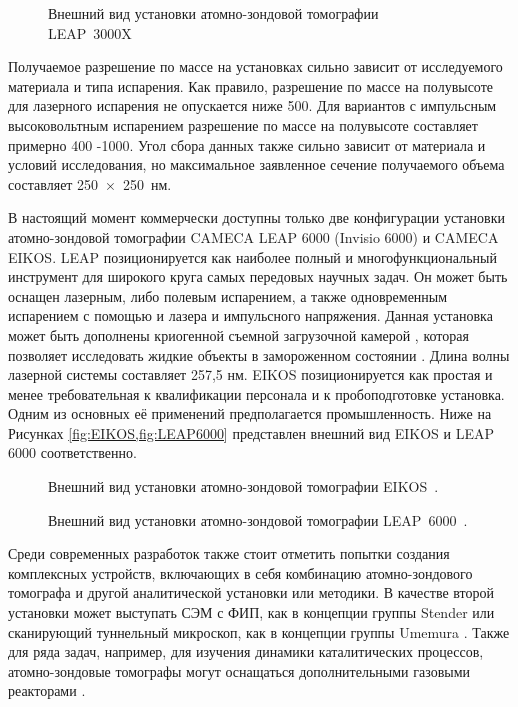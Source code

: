 \begin{figure}[htb]
	\caption{Внешний вид установки атомно-зондовой томографии LEAP~3000X~\cite{LEAP3000}}
	\label{fig:leap3000}
\end{figure}

Получаемое разрешение по массе на установках сильно зависит от исследуемого материала и типа испарения. Как правило, разрешение по массе на полувысоте для лазерного испарения не опускается ниже 500. Для вариантов с импульсным высоковольтным  испарением разрешение по массе на полувысоте составляет примерно 400 -1000. Угол сбора данных также сильно зависит от материала и условий исследования, но максимальное заявленное сечение получаемого объема составляет 250~×~250~нм.

В настоящий момент коммерчески доступны только две конфигурации установки атомно-зондовой томографии CAMECA LEAP 6000 (Invisio 6000) и CAMECA EIKOS. LEAP позиционируется как наиболее полный и многофункциональный инструмент для широкого круга самых передовых научных задач. Он может быть оснащен лазерным, либо полевым испарением, а также одновременным испарением с помощью и лазера и импульсного напряжения. Данная установка может быть дополнены криогенной съемной загрузочной камерой \cite{Stender20}, которая позволяет исследовать жидкие объекты в замороженном состоянии \cite{Schwarz20}. Длина волны лазерной системы составляет 257,5 нм. EIKOS  позиционируется как простая и менее требовательная к квалификации персонала и к пробоподготовке установка. Одним из основных её применений предполагается промышленность. Ниже на Рисунках \cref{fig:EIKOS,fig:LEAP6000} представлен внешний вид EIKOS и LEAP 6000 соответственно.

\begin{figure}[htb]
	\caption{Внешний вид установки атомно-зондовой томографии EIKOS~\cite{EIKOS}.}
	\label{fig:EIKOS}
\end{figure}

\begin{figure}[htb]
	\caption{Внешний вид установки атомно-зондовой томографии LEAP~6000~\cite{LEAP6000}.}
	\label{fig:LEAP6000}
\end{figure}

\FloatBarrier

Среди современных разработок также стоит отметить попытки создания комплексных устройств, включающих в себя комбинацию атомно-зондового томографа и другой аналитической установки или методики. В качестве второй установки может выступать СЭМ с ФИП, как в концепции группы Stender \cite{Stender22} или сканирующий туннельный микроскоп, как в концепции группы Umemura \cite{Umemura19}. Также для ряда задач, например, для изучения динамики каталитических процессов, атомно-зондовые томографы могут оснащаться дополнительными газовыми реакторами \cite{Lambeets20}.

